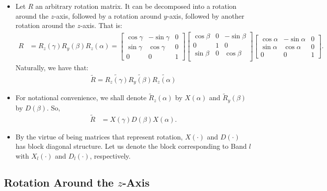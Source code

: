 \documentclass[10pt]{article}
\begin{document}
\begin{itemize}
        \item Let $R$ an arbitrary rotation matrix.  It can be decomposed into a rotation around the $z$-axis, followed by a rotation around $y$-axis, followed by another rotation around the $z$-axis.  That is:
        \begin{align*}
            R 
            &= R_z(\gamma) R_y(\beta) R_z(\alpha)
            = \begin{bmatrix}
                \cos\gamma & -\sin\gamma & 0 \\
                \sin\gamma & \cos\gamma & 0 \\
                0 & 0 & 1
            \end{bmatrix}
            \begin{bmatrix}
                \cos\beta & 0 & -\sin\beta \\
                0 & 1 & 0 \\
                \sin\beta & 0 & \cos\beta \\
            \end{bmatrix}
            \begin{bmatrix}
                \cos\alpha & -\sin\alpha & 0 \\
                \sin\alpha & \cos\alpha & 0 \\
                0 & 0 & 1
            \end{bmatrix}.
        \end{align*}
        Naturally, we have that:
        \begin{align*}
            \tilde{R} = \widetilde{R_z(\gamma)} \widetilde{R_y(\beta)} \widetilde{R_z(\alpha)}
        \end{align*}

        \item For notational convenience, we shall denote $\widetilde{R}_z(\alpha)$ by $X(\alpha)$ and $\widetilde{R}_y(\beta)$ by $D(\beta)$.  So,
        \begin{align*}
            \tilde{R} &= X(\gamma) D(\beta) X(\alpha).
        \end{align*}

        \item By the virtue of being matrices that represent rotation, $X(\cdot)$ and $D(\cdot)$ has block diagonal structure.  Let us denote the block corresponding to Band $l$ with $X_l(\cdot)$ and $D_l(\cdot)$, respectively.
    \end{itemize}

    \subsection{Rotation Around the $z$-Axis}
\end{document}

